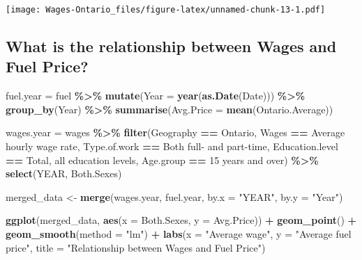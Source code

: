 \documentclass[
]{article}
\newenvironment{Shaded}{\begin{snugshade}}{\end{snugshade}}
\newcommand{\AttributeTok}[1]{\textcolor[rgb]{0.13,0.29,0.53}{#1}}
\newcommand{\FunctionTok}[1]{\textcolor[rgb]{0.13,0.29,0.53}{\textbf{#1}}}
\newcommand{\NormalTok}[1]{#1}
\newcommand{\OtherTok}[1]{\textcolor[rgb]{0.56,0.35,0.01}{#1}}
\newcommand{\SpecialCharTok}[1]{\textcolor[rgb]{0.81,0.36,0.00}{\textbf{#1}}}
\newcommand{\StringTok}[1]{\textcolor[rgb]{0.31,0.60,0.02}{#1}}
\begin{document}
\texttt{[image: Wages-Ontario\_files/figure-latex/unnamed-chunk-13-1.pdf]}

\subsection{What is the relationship between Wages and Fuel
Price?}\label{what-is-the-relationship-between-wages-and-fuel-price}

\begin{Shaded}
\begin{Highlighting}[]
\NormalTok{fuel.year }\OtherTok{=}\NormalTok{ fuel }\SpecialCharTok{\%\textgreater{}\%}
  \FunctionTok{mutate}\NormalTok{(}\AttributeTok{Year =} \FunctionTok{year}\NormalTok{(}\FunctionTok{as.Date}\NormalTok{(Date))) }\SpecialCharTok{\%\textgreater{}\%}
  \FunctionTok{group\_by}\NormalTok{(Year) }\SpecialCharTok{\%\textgreater{}\%}
  \FunctionTok{summarise}\NormalTok{(}\AttributeTok{Avg.Price =} \FunctionTok{mean}\NormalTok{(Ontario.Average))}

\NormalTok{wages.year }\OtherTok{=}\NormalTok{ wages }\SpecialCharTok{\%\textgreater{}\%}
  \FunctionTok{filter}\NormalTok{(Geography }\SpecialCharTok{==} \StringTok{\textquotesingle{}Ontario\textquotesingle{}}\NormalTok{,}
\NormalTok{         Wages }\SpecialCharTok{==} \StringTok{\textquotesingle{}Average hourly wage rate\textquotesingle{}}\NormalTok{,}
\NormalTok{         Type.of.work }\SpecialCharTok{==} \StringTok{\textquotesingle{}Both full{-} and part{-}time\textquotesingle{}}\NormalTok{,}
\NormalTok{         Education.level }\SpecialCharTok{==} \StringTok{\textquotesingle{}Total, all education levels\textquotesingle{}}\NormalTok{,}
\NormalTok{         Age.group }\SpecialCharTok{==} \StringTok{\textquotesingle{}15 years and over\textquotesingle{}}\NormalTok{) }\SpecialCharTok{\%\textgreater{}\%}
  \FunctionTok{select}\NormalTok{(YEAR, Both.Sexes)}

\NormalTok{merged\_data }\OtherTok{\textless{}{-}} \FunctionTok{merge}\NormalTok{(wages.year, fuel.year, }\AttributeTok{by.x =} \StringTok{"YEAR"}\NormalTok{, }\AttributeTok{by.y =} \StringTok{"Year"}\NormalTok{)}

\FunctionTok{ggplot}\NormalTok{(merged\_data, }\FunctionTok{aes}\NormalTok{(}\AttributeTok{x =}\NormalTok{ Both.Sexes, }\AttributeTok{y =}\NormalTok{ Avg.Price)) }\SpecialCharTok{+}
  \FunctionTok{geom\_point}\NormalTok{() }\SpecialCharTok{+}
  \FunctionTok{geom\_smooth}\NormalTok{(}\AttributeTok{method =} \StringTok{"lm"}\NormalTok{) }\SpecialCharTok{+}
  \FunctionTok{labs}\NormalTok{(}\AttributeTok{x =} \StringTok{"Average wage"}\NormalTok{, }
       \AttributeTok{y =} \StringTok{"Average fuel price"}\NormalTok{, }
       \AttributeTok{title =} \StringTok{"Relationship between Wages and Fuel Price"}\NormalTok{)}
\end{Highlighting}
\end{Shaded}
\end{document}
